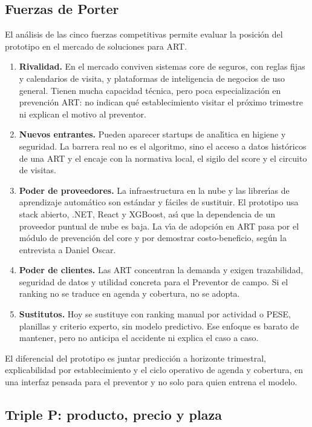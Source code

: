 \subsection{Fuerzas de Porter}

El an\'alisis de las cinco fuerzas competitivas \parencite{porter1979} permite evaluar la posici\'on del prototipo en el mercado de soluciones para ART.

\begin{enumerate}
	\item \textbf{Rivalidad.}
	En el mercado conviven sistemas core de seguros, con reglas fijas y calendarios de visita, y plataformas de inteligencia de negocios de uso general.
	Tienen mucha capacidad t\'ecnica, pero poca especializaci\'on en prevenci\'on ART: no indican qu\'e establecimiento visitar el pr\'oximo trimestre ni explican el motivo al preventor.
	\item \textbf{Nuevos entrantes.}
	Pueden aparecer startups de anal\'{\i}tica en higiene y seguridad.
	La barrera real no es el algoritmo, sino el acceso a datos hist\'oricos de una ART y el encaje con la normativa local, el sigilo del score y el circuito de visitas.
	\item \textbf{Poder de proveedores.}
	La infraestructura en la nube y las librer\'{\i}as de aprendizaje autom\'atico son est\'andar y f\'aciles de sustituir.
	El prototipo usa stack abierto, .NET, React y XGBoost, as\'{\i} que la dependencia de un proveedor puntual de nube es baja.
	La v\'{\i}a de adopci\'on en ART pasa por el m\'odulo de prevenci\'on del core y por demostrar costo-beneficio, seg\'un la entrevista a Daniel Oscar.
	\item \textbf{Poder de clientes.}
	Las ART concentran la demanda y exigen trazabilidad, seguridad de datos y utilidad concreta para el Preventor de campo.
	Si el ranking no se traduce en agenda y cobertura, no se adopta.
	\item \textbf{Sustitutos.}
	Hoy se sustituye con ranking manual por actividad o PESE, planillas y criterio experto, sin modelo predictivo.
	Ese enfoque es barato de mantener, pero no anticipa el accidente ni explica el caso a caso.
\end{enumerate}

El diferencial del prototipo es juntar predicci\'on a horizonte trimestral, explicabilidad por establecimiento y el ciclo operativo de agenda y cobertura, en una interfaz pensada para el preventor y no solo para quien entrena el modelo.

\subsection{Triple P: producto, precio y plaza}

